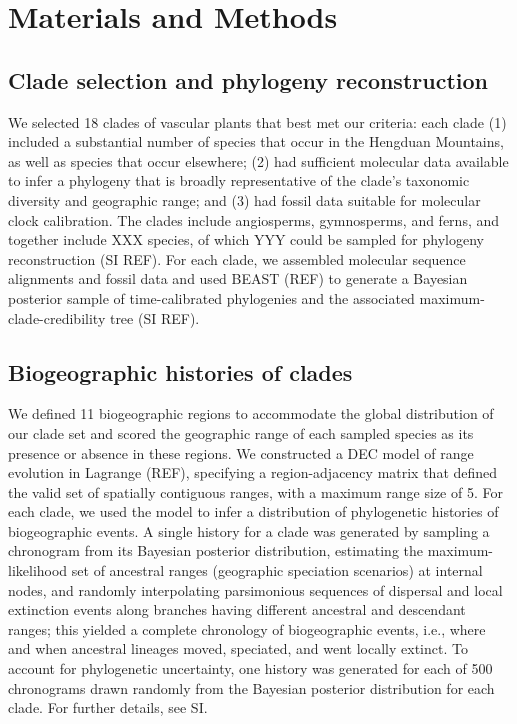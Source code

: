 \section{Materials and Methods}

\subsection{Clade selection and phylogeny reconstruction}

We selected 18 clades of vascular plants that best met our criteria: each clade (1) included a substantial number of species that occur in the Hengduan Mountains, as well as species that occur elsewhere; (2) had sufficient molecular data available to infer a phylogeny that is broadly representative of the clade's taxonomic diversity and geographic range; and (3) had fossil data suitable for molecular clock calibration. The clades include angiosperms, gymnosperms, and ferns, and together include XXX species, of which YYY could be sampled for phylogeny reconstruction (SI REF). For each clade, we assembled molecular sequence alignments and fossil data and used BEAST (REF) to generate a Bayesian posterior sample of time-calibrated phylogenies and the associated maximum-clade-credibility tree (SI REF).

\subsection{Biogeographic histories of clades}

We defined 11 biogeographic regions to accommodate the global distribution of our clade set and scored the geographic range of each sampled species as its presence or absence in these regions. We constructed a DEC model of range evolution in Lagrange (REF), specifying a region-adjacency matrix that defined the valid set of spatially contiguous ranges, with a maximum range size of 5. For each clade, we used the model to infer a distribution of phylogenetic histories of biogeographic events. A single history for a clade was generated by sampling a chronogram from its Bayesian posterior distribution, estimating the maximum-likelihood set of ancestral ranges (geographic speciation scenarios) at internal nodes, and randomly interpolating parsimonious sequences of dispersal and local extinction events along branches having different ancestral and descendant ranges; this yielded a complete chronology of biogeographic events, i.e., where and when ancestral lineages moved, speciated, and went locally extinct. To account for phylogenetic uncertainty, one history was generated for each of 500 chronograms drawn randomly from the Bayesian posterior distribution for each clade. For further details, see SI.

